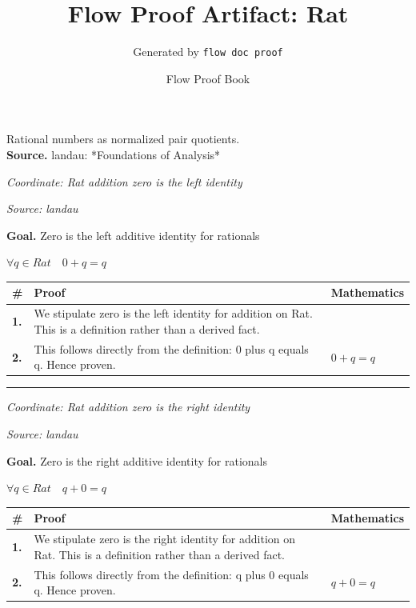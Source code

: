 \documentclass[11pt]{article}
\title{Flow Proof Artifact: Rat}
\author{Generated by \texttt{flow doc proof}}
\date{Flow Proof Book}
\theoremstyle{definition}
\begin{document}
\maketitle
Rational numbers as normalized pair quotients.\\[0.5em]
\textbf{Source.} landau: *Foundations of Analysis*\\[0.5em]
\bigskip
{}\par
\smallskip\noindent\textit{Coordinate: Rat \cdot addition \cdot zero is the left identity}\par
\smallskip\noindent\textit{Source: landau}\par
\medskip
\noindent\textbf{Goal.} Zero is the left additive identity for rationals\par
\noindent$\displaystyle \forall q \in Rat\quad 0 + q = q$\par
\medskip
\noindent
\begin{tabular}{@{} >{\raggedright\arraybackslash}p{} >{\raggedright\arraybackslash}p{} >{\raggedleft\arraybackslash}p{} @{}}
\textbf{\#} & \textbf{Proof} & \textbf{Mathematics} \\
\midrule
\textbf{1.} & We stipulate zero is the left identity for addition on Rat. This is a definition rather than a derived fact. & \\[0.45em]
\textbf{2.} & This follows directly from the definition: 0 plus q equals q. Hence proven. & $\displaystyle 0 + q = q$ \\[0.45em]
\bottomrule
\end{tabular}
\label{thm:Rat-addition-zero_is_the_left_identity}
\par\medskip\hrule
\bigskip
{}\par
\smallskip\noindent\textit{Coordinate: Rat \cdot addition \cdot zero is the right identity}\par
\smallskip\noindent\textit{Source: landau}\par
\medskip
\noindent\textbf{Goal.} Zero is the right additive identity for rationals\par
\noindent$\displaystyle \forall q \in Rat\quad q + 0 = q$\par
\medskip
\noindent
\begin{tabular}{@{} >{\raggedright\arraybackslash}p{} >{\raggedright\arraybackslash}p{} >{\raggedleft\arraybackslash}p{} @{}}
\textbf{\#} & \textbf{Proof} & \textbf{Mathematics} \\
\midrule
\textbf{1.} & We stipulate zero is the right identity for addition on Rat. This is a definition rather than a derived fact. & \\[0.45em]
\textbf{2.} & This follows directly from the definition: q plus 0 equals q. Hence proven. & $\displaystyle q + 0 = q$ \\[0.45em]
\bottomrule
\end{tabular}
\end{document}
